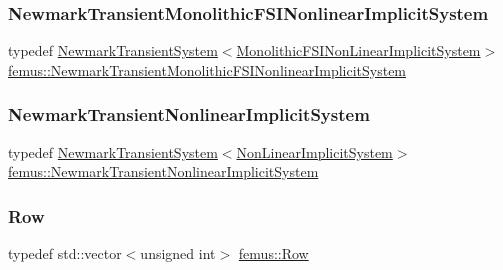 \subsubsection{\texorpdfstring{Newmark\+Transient\+Monolithic\+F\+S\+I\+Nonlinear\+Implicit\+System}{NewmarkTransientMonolithicFSINonlinearImplicitSystem}}
{\footnotesize\ttfamily typedef \mbox{\hyperlink{classfemus_1_1_newmark_transient_system}{Newmark\+Transient\+System}}$<$\mbox{\hyperlink{classfemus_1_1_monolithic_f_s_i_non_linear_implicit_system}{Monolithic\+F\+S\+I\+Non\+Linear\+Implicit\+System}}$>$ \mbox{\hyperlink{namespacefemus_aab0a10b69763dee70d4d6177b73252a4}{femus\+::\+Newmark\+Transient\+Monolithic\+F\+S\+I\+Nonlinear\+Implicit\+System}}}

\mbox{\label{namespacefemus_a5b8a35c2b95db5c6081904c7e8c50145}} 
\subsubsection{\texorpdfstring{Newmark\+Transient\+Nonlinear\+Implicit\+System}{NewmarkTransientNonlinearImplicitSystem}}
{\footnotesize\ttfamily typedef \mbox{\hyperlink{classfemus_1_1_newmark_transient_system}{Newmark\+Transient\+System}}$<$\mbox{\hyperlink{classfemus_1_1_non_linear_implicit_system}{Non\+Linear\+Implicit\+System}}$>$ \mbox{\hyperlink{namespacefemus_a5b8a35c2b95db5c6081904c7e8c50145}{femus\+::\+Newmark\+Transient\+Nonlinear\+Implicit\+System}}}

\mbox{\label{namespacefemus_a9d3cdeab96878814c3e8a007fb4b055f}} 
\subsubsection{\texorpdfstring{Row}{Row}}
{\footnotesize\ttfamily typedef std\+::vector$<$unsigned int$>$ \mbox{\hyperlink{namespacefemus_a9d3cdeab96878814c3e8a007fb4b055f}{femus\+::\+Row}}}

\mbox{\label{namespacefemus_abe2c25355d84d2a659e9f8e952a58062}} 
